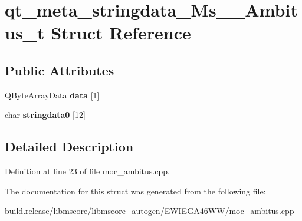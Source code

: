 \hypertarget{structqt__meta__stringdata___ms_____ambitus__t}{}\section{qt\+\_\+meta\+\_\+stringdata\+\_\+\+Ms\+\_\+\+\_\+\+Ambitus\+\_\+t Struct Reference}
\label{structqt__meta__stringdata___ms_____ambitus__t}
\subsection*{Public Attributes}
\begin{DoxyCompactItemize}
\item 
\mbox{\label{structqt__meta__stringdata___ms_____ambitus__t_a24d880c9f80517ac5e308139887869b4}} 
Q\+Byte\+Array\+Data {\bfseries data} \mbox{[}1\mbox{]}
\item 
\mbox{\label{structqt__meta__stringdata___ms_____ambitus__t_a4984eb454dc8ac11dd2217df8099c753}} 
char {\bfseries stringdata0} \mbox{[}12\mbox{]}
\end{DoxyCompactItemize}


\subsection{Detailed Description}


Definition at line 23 of file moc\+\_\+ambitus.\+cpp.



The documentation for this struct was generated from the following file\+:\begin{DoxyCompactItemize}
\item 
build.\+release/libmscore/libmscore\+\_\+autogen/\+E\+W\+I\+E\+G\+A46\+W\+W/moc\+\_\+ambitus.\+cpp\end{DoxyCompactItemize}
